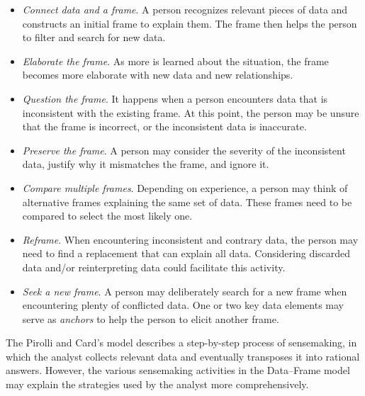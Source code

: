 \begin{itemize}
	\item \emph{Connect data and a frame}. A person recognizes relevant pieces of data and constructs an initial frame to explain them. The frame then helps the person to filter and search for new data.
	\item \emph{Elaborate the frame}. As more is learned about the situation, the frame becomes more elaborate with new data and new relationships. 
	\item \emph{Question the frame}. It happens when a person encounters data that is inconsistent with the existing frame. At this point, the person may be unsure that the frame is incorrect, or the inconsistent data is inaccurate.
	\item \emph{Preserve the frame}. A person may consider the severity of the inconsistent data, justify why it mismatches the frame, and ignore it.
	\item \emph{Compare multiple frames}. Depending on experience, a person may think of alternative frames explaining the same set of data. These frames need to be compared to select the most likely one.
	\item \emph{Reframe}. When encountering inconsistent and contrary data, the person may need to find a replacement that can explain all data. Considering discarded data and/or reinterpreting data could facilitate this activity.
	\item \emph{Seek a new frame}. A person may deliberately search for a new frame when encountering plenty of conflicted data. One or two key data elements may serve as \emph{anchors} to help the person to elicit another frame.
\end{itemize}

The Pirolli and Card's model describes a step-by-step process of sensemaking, in which the analyst collects relevant data and eventually transposes it into rational answers. However, the various sensemaking activities in the Data--Frame model may explain the strategies used by the analyst more comprehensively.

